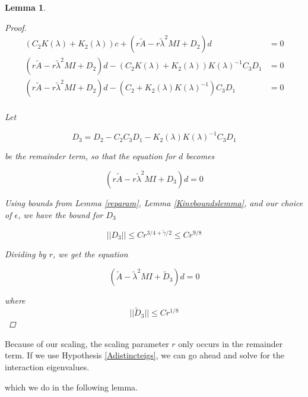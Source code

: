 \documentclass[12pt]{article}
\newtheorem{lemma}{Lemma}
\begin{document}
\begin{lemma}
\begin{proof}
\begin{align*}
(C_2 K(\lambda) + K_2(\lambda))c + (r\tilde{A} - r \tilde{\lambda}^2 MI + D_2)d &= 0 \\
(r\tilde{A} - r \tilde{\lambda}^2 MI + D_2)d - (C_2 K(\lambda) + K_2(\lambda))K(\lambda)^{-1} C_3 D_1 &= 0 \\
(r\tilde{A} - r \tilde{\lambda}^2 MI + D_2)d - (C_2 + K_2(\lambda)K(\lambda)^{-1}) C_3 D_1 &= 0 \\
\end{align*}

Let 

\[
D_3 = D_2 - C_2 C_3 D_1 - K_2(\lambda) K(\lambda)^{-1} C_3 D_1
\]

be the remainder term, so that the equation for $d$ becomes

\[
(r\tilde{A} - r \tilde{\lambda}^2 MI + D_3)d = 0
\]

Using bounds from Lemma \ref{reparam}, Lemma \ref{Kinvboundslemma}, and our choice of $\epsilon$, we have the bound for $D_3$

\[
||D_3|| \leq C r^{3/4 + \tilde{\gamma}/2} \leq C r^{9/8}
\]

Dividing by $r$, we get the equation 

\[
(\tilde{A} - \tilde{\lambda}^2 MI + \tilde{D}_3)d = 0
\]

where 
\[
||\tilde{D}_3|| \leq C r^{1/8}
\]

\end{proof}
\end{lemma}

Because of our scaling, the scaling parameter $r$ only occurs in the remainder term. If we use Hypothesis \ref{Adistincteigs}, we can go ahead and solve for the interaction eigenvalues.


which we do in the following lemma.

\end{document}
